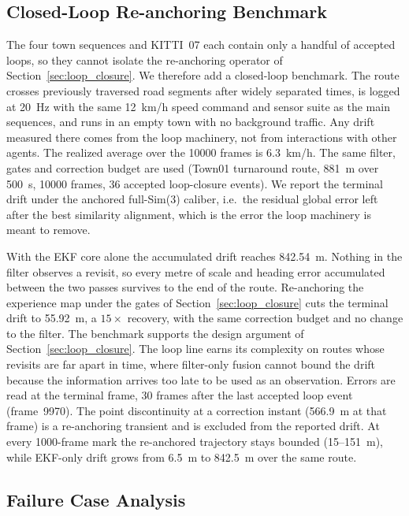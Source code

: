 \subsection{Closed-Loop Re-anchoring Benchmark}
\label{sec:closed_loop}

The four town sequences and KITTI~07 each contain only a handful of accepted loops, so they cannot isolate the re-anchoring operator of Section~\ref{sec:loop_closure}. We therefore add a closed-loop benchmark. The route crosses previously traversed road segments after widely separated times, is logged at 20~Hz with the same 12~km/h speed command and sensor suite as the main sequences, and runs in an empty town with no background traffic. Any drift measured there comes from the loop machinery, not from interactions with other agents. The realized average over the 10000 frames is 6.3~km/h. The same filter, gates and correction budget are used (Town01 turnaround route, 881~m over 500~s, 10000 frames, 36 accepted loop-closure events). We report the terminal drift under the anchored full-Sim(3) caliber, i.e.\ the residual global error left after the best similarity alignment, which is the error the loop machinery is meant to remove.

With the EKF core alone the accumulated drift reaches 842.54~m. Nothing in the filter observes a revisit, so every metre of scale and heading error accumulated between the two passes survives to the end of the route. Re-anchoring the experience map under the gates of Section~\ref{sec:loop_closure} cuts the terminal drift to 55.92~m, a $15\times$ recovery, with the same correction budget and no change to the filter. The benchmark supports the design argument of Section~\ref{sec:loop_closure}. The loop line earns its complexity on routes whose revisits are far apart in time, where filter-only fusion cannot bound the drift because the information arrives too late to be used as an observation. Errors are read at the terminal frame, 30 frames after the last accepted loop event (frame~9970). The point discontinuity at a correction instant (566.9~m at that frame) is a re-anchoring transient and is excluded from the reported drift. At every 1000-frame mark the re-anchored trajectory stays bounded (15--151~m), while EKF-only drift grows from 6.5~m to 842.5~m over the same route.

\subsection{Failure Case Analysis}
\label{sec:failure_analysis}

